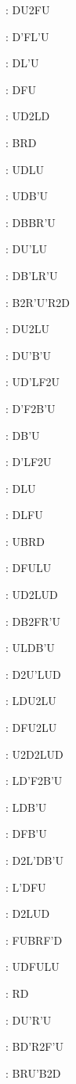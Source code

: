 \documentclass[9pt]{article}
\begin{document}
{\begin{multicols}{6}
: DU2FU

: D'FL'U

: DL'U

: DFU

: UD2LD

: BRD

: UDLU

: UDB'U

: DBBR'U

: DU'LU

: DB'LR'U

: B2R'U'R2D

: DU2LU

: DU'B'U

: UD'LF2U

: D'F2B'U

: DB'U

: D'LF2U

: DLU

: DLFU

: UBRD

: DFULU

: UD2LUD

: DB2FR'U

: ULDB'U

: D2U'LUD

: LDU2LU

: DFU2LU

: U2D2LUD

: LD'F2B'U

: LDB'U

: DFB'U

: D2L'DB'U

: L'DFU

: D2LUD

: FUBRF'D

: UDFULU

: RD

: DU'R'U

: BD'R2F'U

: BRU'B2D


\end{multicols}}
\end{document}
